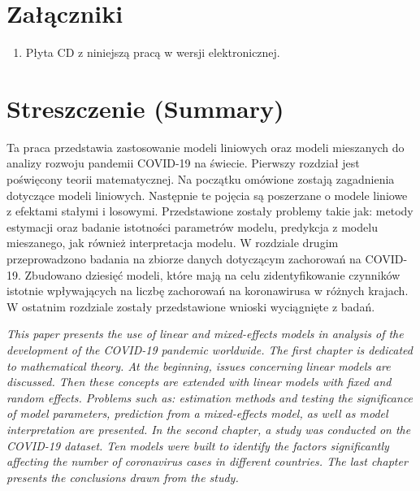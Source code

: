 \documentclass[12pt]{mwbk}
\theoremstyle{plain}
\theoremstyle{definition}
\theoremstyle{remark}
\begin{document}
\listoffigures

\listoftables


\chapter*{Załączniki}
\begin{enumerate}
\item Płyta CD z niniejszą pracą w wersji elektronicznej.
\end{enumerate}




\chapter*{Streszczenie (Summary)}

\bigskip
\bigskip

\begin{center}
  \textbf{\tytul}
\end{center}

Ta praca przedstawia zastosowanie modeli liniowych oraz modeli mieszanych do analizy rozwoju pandemii COVID-19 na świecie. Pierwszy rozdział jest poświęcony teorii matematycznej. Na początku omówione zostają zagadnienia dotyczące modeli liniowych. Następnie te pojęcia są poszerzane o modele liniowe z efektami stałymi i losowymi. Przedstawione zostały problemy takie jak: metody estymacji oraz badanie istotności parametrów modelu, predykcja z modelu mieszanego, jak również interpretacja modelu. W rozdziale drugim przeprowadzono badania na zbiorze danych dotyczącym zachorowań na COVID-19. Zbudowano dziesięć modeli, które mają na celu zidentyfikowanie czynników istotnie wpływających na liczbę zachorowań na koronawirusa w różnych krajach. W ostatnim rozdziale zostały przedstawione wnioski wyciągnięte z badań.


\bigskip

\begin{center}
  \textbf{\textit{\tytulangielski}}
\end{center}



{\it
This paper presents the use of linear and mixed-effects models in analysis of the development of the COVID-19 pandemic worldwide. The first chapter is dedicated to mathematical theory. At the beginning, issues concerning linear models are discussed. Then these concepts are extended with linear models with fixed and random effects. Problems such as: estimation methods and testing the significance of model parameters, prediction from a mixed-effects model, as well as model interpretation are presented. In the second chapter, a study was conducted on the COVID-19 dataset. Ten models were built to identify the factors significantly affecting the number of coronavirus cases in different countries. The last chapter presents the conclusions drawn from the study.

}
\end{document}
